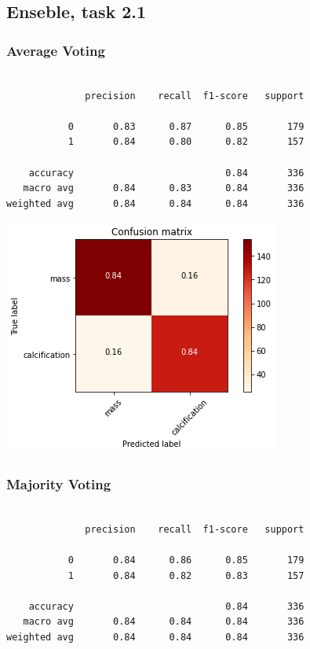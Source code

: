\documentclass{article}
\begin{document}
\subsection{Enseble, task 2.1}
\subsubsection{Average Voting}

\begin{verbatim}

              precision    recall  f1-score   support

           0       0.83      0.87      0.85       179
           1       0.84      0.80      0.82       157

    accuracy                           0.84       336
   macro avg       0.84      0.83      0.84       336
weighted avg       0.84      0.84      0.84       336

\end{verbatim}

\begin{center}
\begin{minipage}{0.45\textwidth}
        \includegraphics[scale=0.6]{./img/cmEnsAvg2_1.png}
    \end{minipage}
\end{center}

\subsubsection{Majority Voting}
\begin{verbatim}

              precision    recall  f1-score   support

           0       0.84      0.86      0.85       179
           1       0.84      0.82      0.83       157

    accuracy                           0.84       336
   macro avg       0.84      0.84      0.84       336
weighted avg       0.84      0.84      0.84       336

\end{verbatim}
\end{document}
